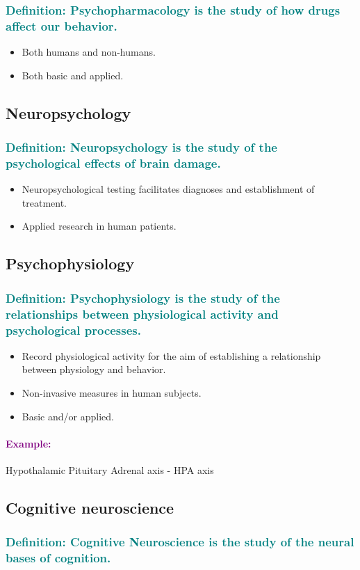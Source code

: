 \documentclass[12pt,a4paper]{article}
\newcommand{\definition}[1]{\subsubsection*{\textcolor{teal}{Definition: #1}}}
\newcommand{\example}[1]{\paragraph{\textcolor{purple}{Example:}} #1}
\begin{document}
	\definition{\textbf{Psychopharmacology} is the study of how drugs affect our behavior.}
	
	\begin{itemize}
		\item Both humans and non-humans.
		\item Both basic and applied. 
	\end{itemize}
	
	\subsection{Neuropsychology}
	
	\definition{\textbf{Neuropsychology} is the study of the psychological effects of brain damage.}
	
	\begin{itemize}
		\item Neuropsychological testing facilitates diagnoses and establishment of treatment. 
		\item Applied research in human patients. 
	\end{itemize}
	
	\subsection{Psychophysiology}
	
	\definition{\textbf{Psychophysiology} is the study of the relationships between physiological activity and psychological processes.}
	
	\begin{itemize}
		\item Record physiological activity for the aim of establishing a relationship between physiology and behavior. 
		\item Non-invasive measures in human subjects. 
		\item Basic and/or applied. 
	\end{itemize}
	
	\example{Hypothalamic Pituitary Adrenal axis - HPA axis}
	
	\subsection{Cognitive neuroscience}
	
	\definition{\textbf{Cognitive Neuroscience} is the study of the neural bases of cognition.}
	
\end{document}
